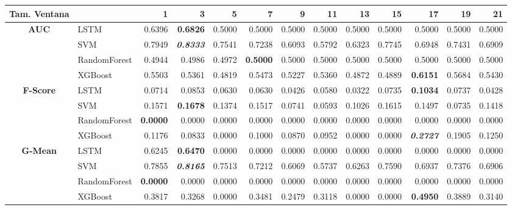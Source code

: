 \begin{table}[H]
	\centering
	\begin{adjustbox}{max width=12cm}
		\begin{tabular}{|c|l|r|r|r|r|r|r|r|r|r|r|r|}
			\hline
			\textbf{Tam. Ventana} &         &      1  &      3  &      5  &      7  &      9  &      11 &      13 &      15 &      17 &      19 &      21 \\
			\hline
			\textbf{AUC} &  LSTM &  0.6396 & \textbf{  0.6826 } &  0.5000 &  0.5000 &  0.5000 &  0.5000 &  0.5000 &  0.5000 &  0.5000 &  0.5000 &  0.5000 \\
			&  SVM &  0.7949 & \textit{ \textbf{  0.8333 } } &  0.7541 &  0.7238 &  0.6093 &  0.5792 &  0.6323 &  0.7745 &  0.6948 &  0.7431 &  0.6909 \\
			&  RandomForest &  0.4944 &  0.4986 &  0.4972 & \textbf{  0.5000 } &  0.5000 &  0.5000 &  0.5000 &  0.5000 &  0.5000 &  0.5000 &  0.5000 \\
			&  XGBoost &  0.5503 &  0.5361 &  0.4819 &  0.5473 &  0.5227 &  0.5360 &  0.4872 &  0.4889 & \textbf{  0.6151 } &  0.5684 &  0.5430 \\
			\hline
			\textbf{F-Score} &  LSTM &  0.0714 &  0.0853 &  0.0630 &  0.0630 &  0.0426 &  0.0580 &  0.0322 &  0.0735 & \textbf{  0.1034 } &  0.0737 &  0.0428 \\
			&  SVM &  0.1571 & \textbf{  0.1678 } &  0.1374 &  0.1517 &  0.0741 &  0.0593 &  0.1026 &  0.1615 &  0.1497 &  0.0735 &  0.1418 \\
			&  RandomForest & \textbf{  0.0000 } &  0.0000 &  0.0000 &  0.0000 &  0.0000 &  0.0000 &  0.0000 &  0.0000 &  0.0000 &  0.0000 &  0.0000 \\
			&  XGBoost &  0.1176 &  0.0833 &  0.0000 &  0.1000 &  0.0870 &  0.0952 &  0.0000 &  0.0000 & \textit{ \textbf{  0.2727 } } &  0.1905 &  0.1250 \\
			\hline
			\textbf{G-Mean} &  LSTM &  0.6245 & \textbf{  0.6470 } &  0.0000 &  0.0000 &  0.0000 &  0.0000 &  0.0000 &  0.0000 &  0.0000 &  0.0000 &  0.0000 \\
			&  SVM &  0.7855 & \textit{ \textbf{  0.8165 } } &  0.7513 &  0.7212 &  0.6069 &  0.5737 &  0.6263 &  0.7590 &  0.6937 &  0.7376 &  0.6906 \\
			&  RandomForest & \textbf{  0.0000 } &  0.0000 &  0.0000 &  0.0000 &  0.0000 &  0.0000 &  0.0000 &  0.0000 &  0.0000 &  0.0000 &  0.0000 \\
			&  XGBoost &  0.3817 &  0.3268 &  0.0000 &  0.3481 &  0.2479 &  0.3118 &  0.0000 &  0.0000 & \textbf{  0.4950 } &  0.3889 &  0.3140 \\

\end{tabular}
\end{adjustbox}
\end{table}
